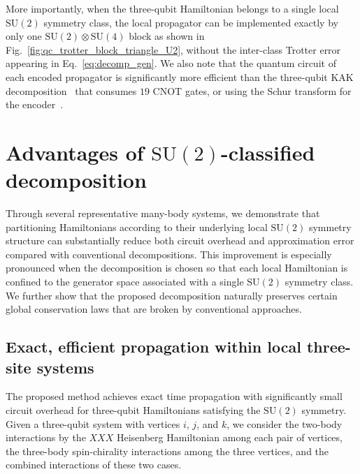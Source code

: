 \documentclass[aps,showpacs,amsmath,amssymb,twocolumn,prx,longbibliography,superscriptaddress,notitlepage,floatfix,10pt]{revtex4-2}
\begin{document}
More importantly, when the three-qubit Hamiltonian belongs to a single local $\mathrm{SU}(2)$ symmetry class, the local propagator can be implemented exactly by only one $\mathrm{SU}(2)\otimes\mathrm{SU}(4)$ block as shown in Fig.~\ref{fig:qc_trotter_block_triangle_U2}, without the inter-class Trotter error appearing in Eq.~\eqref{eq:decomp_gen}.
We also note that the quantum circuit of each encoded propagator is significantly more efficient than the three-qubit KAK decomposition~\cite{Krol2024Beyond} that consumes $19$ CNOT gates, or using the Schur transform for the encoder~\cite{Bacon2006Efficient, Nguyen2023The}.



\section{Advantages of \texorpdfstring{$\mathrm{SU}(2)$}{SU(2)}-classified decomposition}


Through several representative many-body systems, we demonstrate that partitioning Hamiltonians according to their underlying local $\mathrm{SU}(2)$ symmetry structure can substantially reduce both circuit overhead and approximation error compared with conventional decompositions.
This improvement is especially pronounced when the decomposition is chosen so that each local Hamiltonian is confined to the generator space associated with a single $\mathrm{SU}(2)$ symmetry class.
We further show that the proposed decomposition naturally preserves certain global conservation laws that are broken by conventional approaches.


\subsection{Exact, efficient propagation within local three-site systems}

The proposed method achieves exact time propagation with significantly small circuit overhead for three-qubit Hamiltonians satisfying the $\mathrm{SU}(2)$ symmetry.
Given a three-qubit system with vertices $i$, $j$, and $k$, we consider the two-body interactions by the $XXX$ Heisenberg Hamiltonian among each pair of vertices, the three-body spin-chirality interactions among the three vertices, and the combined interactions of these two cases.
\end{document}
